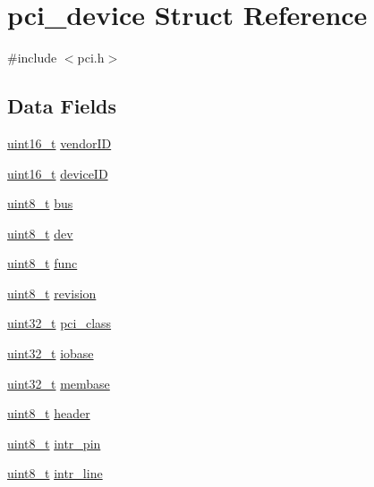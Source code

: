 \hypertarget{structpci__device}{\section{pci\+\_\+device Struct Reference}
\label{structpci__device}
}


{\ttfamily \#include $<$pci.\+h$>$}

\subsection*{Data Fields}
\begin{DoxyCompactItemize}
\item 
\hyperlink{aplus_8h_a5a8b2dc9e45a9ee81a94ef304fb62505}{uint16\+\_\+t} \hyperlink{structpci__device_ac9682451216985995a3601f14239dc26}{vendor\+I\+D}
\item 
\hyperlink{aplus_8h_a5a8b2dc9e45a9ee81a94ef304fb62505}{uint16\+\_\+t} \hyperlink{structpci__device_a86ce8ddd306b0395037ec7eee789a929}{device\+I\+D}
\item 
\hyperlink{aplus_8h_ae0430369c5a35dcdbc0bc19dcbb33a03}{uint8\+\_\+t} \hyperlink{structpci__device_a832940e219d52a08725a39fc97663d07}{bus}
\item 
\hyperlink{aplus_8h_ae0430369c5a35dcdbc0bc19dcbb33a03}{uint8\+\_\+t} \hyperlink{structpci__device_ae456e0d5fb85c5d367b1a4e27f996b96}{dev}
\item 
\hyperlink{aplus_8h_ae0430369c5a35dcdbc0bc19dcbb33a03}{uint8\+\_\+t} \hyperlink{structpci__device_ac292358b1097064cb388125a45740aff}{func}
\item 
\hyperlink{aplus_8h_ae0430369c5a35dcdbc0bc19dcbb33a03}{uint8\+\_\+t} \hyperlink{structpci__device_ad6450a83a220d2015cb94a9698580668}{revision}
\item 
\hyperlink{aplus_8h_a53a0df51603c77c2aa5b9ea61b606a82}{uint32\+\_\+t} \hyperlink{structpci__device_ae1867eca43c8f867951963a1753649ea}{pci\+\_\+class}
\item 
\hyperlink{aplus_8h_a53a0df51603c77c2aa5b9ea61b606a82}{uint32\+\_\+t} \hyperlink{structpci__device_a5b15ddf1741aaae55aa9933f53876d11}{iobase}
\item 
\hyperlink{aplus_8h_a53a0df51603c77c2aa5b9ea61b606a82}{uint32\+\_\+t} \hyperlink{structpci__device_a795ff4e1dc77af09805c41d96766b64b}{membase}
\item 
\hyperlink{aplus_8h_ae0430369c5a35dcdbc0bc19dcbb33a03}{uint8\+\_\+t} \hyperlink{structpci__device_ad68a4bddbd8fa989a866dccdd5035842}{header}
\item 
\hyperlink{aplus_8h_ae0430369c5a35dcdbc0bc19dcbb33a03}{uint8\+\_\+t} \hyperlink{structpci__device_a3645d371b3c45455414e4f8414e9eed8}{intr\+\_\+pin}
\item 
\hyperlink{aplus_8h_ae0430369c5a35dcdbc0bc19dcbb33a03}{uint8\+\_\+t} \hyperlink{structpci__device_a6d2298c5255e65c908f6dfdb29e4fcaf}{intr\+\_\+line}
\end{DoxyCompactItemize}


